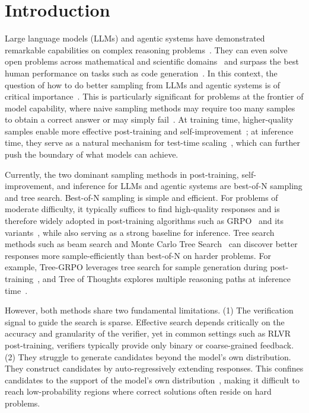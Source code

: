 \section{Introduction}
Large language models (LLMs) and agentic systems have demonstrated remarkable capabilities on complex reasoning problems~\citep{cot, rstar, dsr1}. They can even solve open problems across mathematical and scientific domains~\citep{alphaevolve,alphaproof} and surpass the best human performance on tasks such as code generation~\citep{alphacode, tttdiscover}. In this context, the question of how to do better sampling from LLMs and agentic systems is of critical importance~\citep{rstarmath}. This is particularly significant for problems at the frontier of model capability, where naive sampling methods may require too many samples to obtain a correct answer or may simply fail~\citep{frontiermath,rlincentivize}. At training time, higher-quality samples enable more effective post-training and self-improvement~\citep{star,selfreward}; at inference time, they serve as a natural mechanism for test-time scaling~\citep{selftaught, wu2025inference, shinkaevolve}, which can further push the boundary of what models can achieve.

Currently, the two dominant sampling methods in post-training, self-improvement, and inference for LLMs and agentic systems are best-of-N sampling and tree search. Best-of-N sampling is simple and efficient. For problems of moderate difficulty, it typically suffices to find high-quality responses and is therefore widely adopted in post-training algorithms such as GRPO~\citep{dsr1} and its variants~\citep{dapo}, while also serving as a strong baseline for inference. Tree search methods such as beam search and Monte Carlo Tree Search~\citep{mcts} can discover better responses more sample-efficiently than best-of-N on harder problems. For example, Tree-GRPO leverages tree search for sample generation during post-training~\citep{treegrpo}, and Tree of Thoughts explores multiple reasoning paths at inference time~\citep{tot}.

However, both methods share two fundamental limitations.  (1) The verification signal to guide the search is sparse. Effective search depends critically on the accuracy and granularity of the verifier, yet in common settings such as RLVR post-training, verifiers typically provide only binary or coarse-grained feedback. (2) They struggle to generate candidates beyond the model's own distribution. They construct candidates by auto-regressively extending responses. This confines candidates to the support of the model's own distribution~\citep{llmmonkey}, making it difficult to reach low-probability regions where correct solutions often reside on hard problems.

